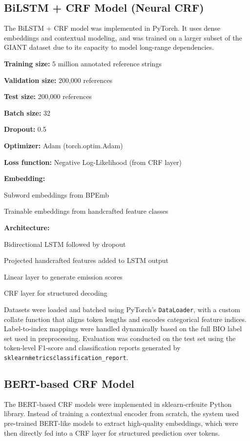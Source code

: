 \subsection{BiLSTM + CRF Model (Neural CRF)}
The BiLSTM + CRF model was implemented in PyTorch. It uses dense embeddings and contextual modeling, and was trained on a larger subset of the GIANT dataset due to its capacity to model long-range dependencies.
\begin{compactitem}
\item \textbf{Training size:} 5 million annotated reference strings
\item \textbf{Validation size:} 200,000 references
\item \textbf{Test size:} 200,000 references
\item \textbf{Batch size:} 32
\item \textbf{Dropout:} 0.5
\item \textbf{Optimizer:} Adam (torch.optim.Adam)
\item \textbf{Loss function:} Negative Log-Likelihood (from CRF layer)
\item \textbf{Embedding:}
\begin{compactitem}
\item Subword embeddings from BPEmb
\item Trainable embeddings from handcrafted feature classes
\end{compactitem}
\item \textbf{Architecture:}
\begin{compactitem}
\item Bidirectional LSTM followed by dropout
\item Projected handcrafted features added to LSTM output
\item Linear layer to generate emission scores
\item CRF layer for structured decoding
\end{compactitem}
\end{compactitem}

Datasets were loaded and batched using PyTorch's \texttt{DataLoader}, with a custom collate function that aligns token lengths and encodes categorical feature indices. Label-to-index mappings were handled dynamically based on the full BIO label set used in preprocessing.
Evaluation was conducted on the test set using the token-level F1-score and classification reports generated by \texttt{sklearn\.metrics\.classification\_report}.

\subsection{BERT-based CRF Model}
The BERT-based CRF models were implemented in sklearn-crfsuite Python library. Instead of training a contextual encoder from scratch, the system used pre-trained BERT-like models to extract high-quality embeddings, which were then directly fed into a CRF layer for structured prediction over tokens.

